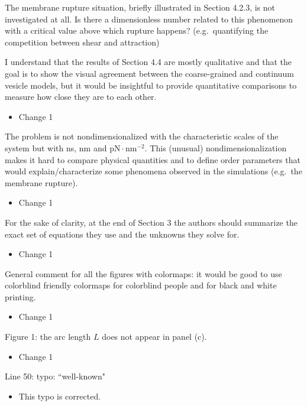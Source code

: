 \documentclass[11pt]{article}
\newcommand{\comment}[1]{{\color{blue} #1}}
\begin{document}
\noindent
\comment{The membrane rupture situation, briefly illustrated in Section
4.2.3, is not investigated at all. Is there a dimensionless number
related to this phenomenon with a critical value above which rupture
happens? (e.g.~quantifying the competition between shear and
attraction)}

\noindent
\comment{I understand that the results of Section 4.4 are mostly
qualitative and that the goal is to show the visual agreement between
the coarse-grained and continuum vesicle models, but it would be
insightful to provide quantitative comparisons to measure how close they
are to each other.}
\begin{itemize}
  \item Change 1 
\end{itemize}

\noindent
\comment{The problem is not nondimensionalized with the characteristic
scales of the system but with ns, nm and $\text{pN} \cdot
\text{nm}^{-2}$. This (unusual) nondimensionalization makes it hard to
compare physical quantities and to define order parameters that would
explain/characterize some phenomena observed in the simulations
(e.g.~the membrane rupture).}
\begin{itemize}
  \item Change 1 
\end{itemize}

\noindent
\comment{For the sake of clarity, at the end of Section 3 the authors
should summarize the exact set of equations they use and the unknowns
they solve for.}
\begin{itemize}
  \item Change 1 
\end{itemize}

\noindent
\comment{General comment for all the figures with colormaps: it would be
good to use colorblind friendly colormaps for colorblind people and for
black and white printing.}
\begin{itemize}
  \item Change 1 
\end{itemize}

\noindent
\comment{Figure 1: the arc length $L$ does not appear in panel (c).}
\begin{itemize}
  \item Change 1 
\end{itemize}

\noindent
\comment{Line 50: typo: ``well-known"}
\begin{itemize}
  \item This typo is corrected.
\end{itemize}
\end{document}
